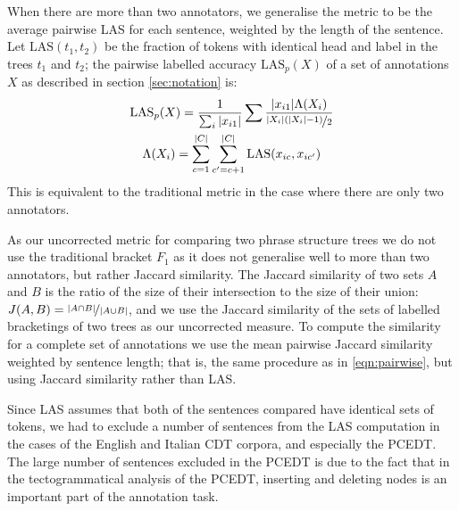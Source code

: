 \documentclass[11pt]{article}
\let\oldfrac=\frac
\renewcommand\frac[2]{\mathchoice{\oldfrac{#1}{#2}}{\nicefrac{#1}{#2}}{\nicefrac{#1}{#2}}{\nicefrac{#1}{#2}}}
\begin{document}
When there are more than two annotators, we generalise the metric to be the
average pairwise LAS for each sentence, weighted by the length of the
sentence. Let $\textrm{LAS}(t_1, t_2)$ be the fraction of tokens with
identical head and label in the trees $t_1$ and $t_2$; the pairwise labelled
accuracy $\textrm{LAS}_p(X)$ of a set of annotations $X$ as described in
section \ref{sec:notation} is:
\begin{gather}
    \textrm{LAS}_p(X) = \frac{1}{\sum_i|x_{i1}|}\sum\frac{|x_{i1}|\Lambda(X_i)}{\frac{|X_i|(|X_i|-1)}{2}} \label{eqn:pairwise} \\
    \Lambda(X_i) = \sum_{c=1}^{|C|}\sum_{c'=c+1}^{|C|}\textrm{LAS}(x_{ic},
    x_{ic'}) \notag
\end{gather}
This is equivalent to the traditional metric in the case where there are only
two annotators.


As our uncorrected metric for comparing two phrase structure trees we do not
use the traditional bracket $F_1$ as it does not generalise well to more than
two annotators, but rather Jaccard similarity. The Jaccard similarity of two
sets $A$ and $B$ is the ratio of the size of their intersection to the size of
their union: $J(A, B) = \frac{|A\cap B|}{|A\cup B|}$, and we use the Jaccard
similarity of the sets of labelled bracketings of two trees as our uncorrected
measure. To compute the similarity for a complete set of annotations we use
the mean pairwise Jaccard similarity weighted by sentence length; that is, the
same procedure as in \ref{eqn:pairwise}, but using Jaccard similarity rather
than LAS.

Since LAS assumes that both of the sentences compared have identical sets of
tokens, we had to exclude a number of sentences from the LAS computation in
the cases of the English and Italian CDT corpora, and especially the PCEDT.
The large number of sentences excluded in the PCEDT is due to the fact that in
the tectogrammatical analysis of the PCEDT, inserting and deleting nodes is an
important part of the annotation task.
\end{document}
